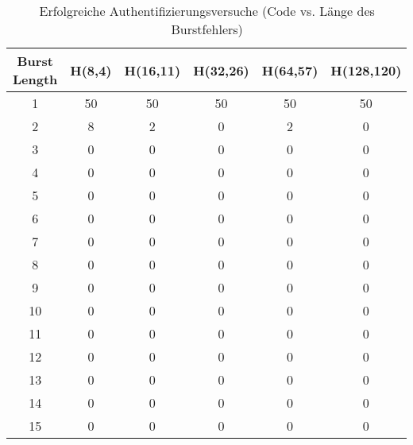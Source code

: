 \begin{table}[h]
    \centering
    \begin{tabular}{c|ccccc}
        Burst Length & H(8,4) & H(16,11) & H(32,26) & H(64,57) & H(128,120)\\\hline
        1 &      50&      50&      50&      50&      50\\      
        2 &      8 &      2 &      0 &      2 &      0 \\      
        3 &      0 &      0 &      0 &      0 &      0 \\      
        4 &      0 &      0 &      0 &      0 &      0 \\      
        5 &      0 &      0 &      0 &      0 &      0 \\      
        6 &      0 &      0 &      0 &      0 &      0 \\      
        7 &      0 &      0 &      0 &      0 &      0 \\      
        8 &      0 &      0 &      0 &      0 &      0 \\      
        9 &      0 &      0 &      0 &      0 &      0 \\      
        10&      0 &      0 &      0 &      0 &      0 \\      
        11&      0 &      0 &      0 &      0 &      0 \\      
        12&      0 &      0 &      0 &      0 &      0 \\      
        13&      0 &      0 &      0 &      0 &      0 \\      
        14&      0 &      0 &      0 &      0 &      0 \\      
        15&      0 &      0 &      0 &      0 &      0
    \end{tabular}
    \caption{Erfolgreiche Authentifizierungsversuche (Code vs. Länge des Burstfehlers)}
    \label{tab:burst_result}
\end{table}